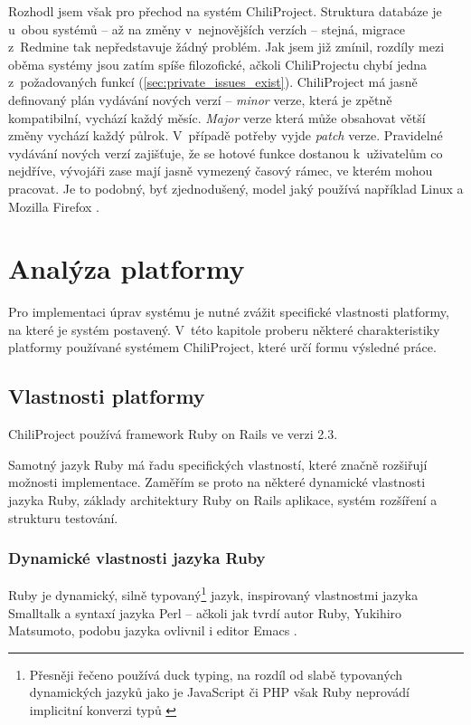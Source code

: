\documentclass[thesis=B,czech]{FITthesis}[2012/05/02]
\begin{document}
Rozhodl jsem však pro přechod na systém ChiliProject. Struktura databáze
je u~obou systémů -- až na změny v~nejnovějších verzích -- stejná,
migrace z~Redmine tak nepředstavuje žádný problém. Jak jsem již zmínil,
rozdíly mezi oběma systémy jsou zatím spíše filozofické, ačkoli
ChiliProjectu chybí jedna z~požadovaných funkcí
(\ref{sec:private_issues_exist}). ChiliProject má jasně definovaný plán
vydávání nových verzí -- \emph{minor} verze, která je zpětně kompatibilní,
vychází každý měsíc. \emph{Major} verze která může obsahovat větší změny
vychází každý půlrok. V~případě potřeby vyjde \emph{patch} verze.
Pravidelné vydávání nových verzí zajišťuje, že se hotové funkce dostanou
k~uživatelům co nejdříve, vývojáři zase mají jasně vymezený časový
rámec, ve kterém mohou pracovat. Je to podobný, byť zjednodušený, model
jaký používá například Linux a Mozilla Firefox
\citep{MozillaDevProcess}.

\chapter{Analýza platformy}
\label{chap:analyza_navrh}

Pro implementaci úprav systému je nutné zvážit specifické vlastnosti
platformy, na které je systém postavený. V~této kapitole proberu některé
charakteristiky platformy používané systémem ChiliProject, které určí
formu výsledné práce.

\section{Vlastnosti platformy}

ChiliProject používá framework Ruby on Rails ve verzi 2.3.

Samotný jazyk Ruby má řadu specifických vlastností, které značně
rozšiřují možnosti implementace. Zaměřím se proto na některé dynamické
vlastnosti jazyka Ruby, základy architektury Ruby on Rails aplikace,
systém rozšíření a strukturu testování.

\subsection{Dynamické vlastnosti jazyka Ruby}
\label{sec:vlastnosti-ruby}

Ruby je dynamický, silně typovaný\footnote{Přesněji řečeno používá
  \gls{duck typing}, na rozdíl od slabě typovaných dynamických jazyků
  jako je JavaScript či PHP však Ruby neprovádí implicitní konverzi typů
  \citep{Lamontagne2007}} jazyk, inspirovaný vlastnostmi jazyka
Smalltalk a syntaxí jazyka Perl \citep{Stewart2001} -- ačkoli jak tvrdí
autor Ruby, Yukihiro  Matsumoto, podobu jazyka ovlivnil i editor
Emacs \citep{Matsumoto2012}.
\end{document}
